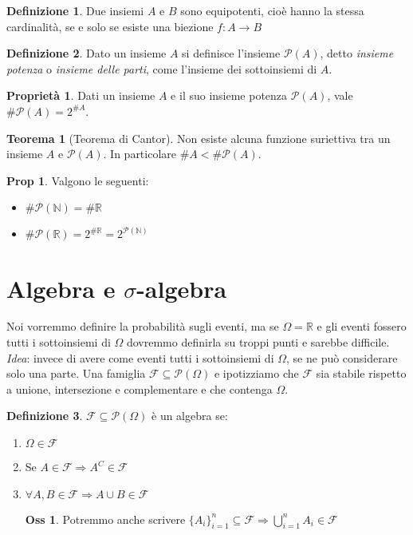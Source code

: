 \documentclass[12pt, a4paper]{report}
\theoremstyle{definition}
\newtheorem{definition}{Definizione}[section]
\newtheorem{theorem}{Teorema}[section]
\newtheorem*{proposition}{Prop}
\newtheorem*{observation}{Oss}
\newtheorem*{property}{Proprietà}
\DeclareRobustCommand{\F}{\mathcal{F}}%
\DeclareRobustCommand{\R}{\mathbb{R}}%
\DeclareRobustCommand{\N}{\mathbb{N}}%
\DeclareRobustCommand{\powerset}{\mathcal{P}(\Omega)}
\DeclareRobustCommand{\tribedef}{\F\subseteq \powerset}
\begin{document}
\begin{definition}
	Due insiemi $A$ e $B$ sono equipotenti, cioè hanno la stessa cardinalità, se
	e solo se esiste una biezione \(f:A\rightarrow B\)
\end{definition}
\begin{definition}
	Dato un insieme $A$	si definisce l'insieme $\mathcal{P}(A)$, detto
	\emph{insieme potenza} o \emph{insieme delle parti}, come l'insieme dei
	sottoinsiemi di $A$.
\end{definition}
\begin{property}
	Dati un insieme $A$ e il suo insieme potenza $\mathcal{P}(A)$, vale
	\(\#\mathcal{P}(A)=2^{\#A}\).
\end{property}
\begin{theorem}[Teorema di Cantor]
	Non esiste alcuna funzione suriettiva tra un insieme $A$ e \(\mathcal{P}(A)\).
	In particolare $\#A<\#\mathcal{P}(A)$.
\end{theorem}
\begin{proposition}
	Valgono le seguenti:
	\begin{itemize}
		\item \(\#\mathcal{P}(\N) = \#\R\)
		\item \(\#\mathcal{P}(\R) = 2^{\#\R} =
		2^{\mathcal{P}(\N)}\)
	\end{itemize}
\end{proposition}

\section{Algebra e $\sigma$-algebra}
Noi vorremmo definire la probabilità sugli eventi, ma se \(\Omega=\R\) e
gli eventi fossero tutti i sottoinsiemi di $\Omega$ dovremmo definirla su troppi
punti e sarebbe difficile.
\\\textit{Idea}: invece di avere come eventi tutti i sottoinsiemi di $\Omega$,
se ne può considerare solo una parte.
Una famiglia $\tribedef$ e ipotizziamo che $\F$ sia stabile rispetto a
unione, intersezione e complementare e che contenga $\Omega$.

\begin{definition}
	$\tribedef$ è un algebra se:
	\begin{enumerate}[label=(\roman*)]
		\item \(\Omega\in \F\)
		\item Se \(A\in\F \Rightarrow A^C\in\F\)
		\item \(\forall A, B\in\F \Rightarrow A\cup B\in\F\)
		\begin{observation}
			Potremmo anche scrivere \(\{A_i\}_{i=1}^n\subseteq \F
			\Rightarrow \bigcup_{i=1}^n A_i\in\F\)
		\end{observation}
	\end{enumerate}
\end{definition}
\end{document}
